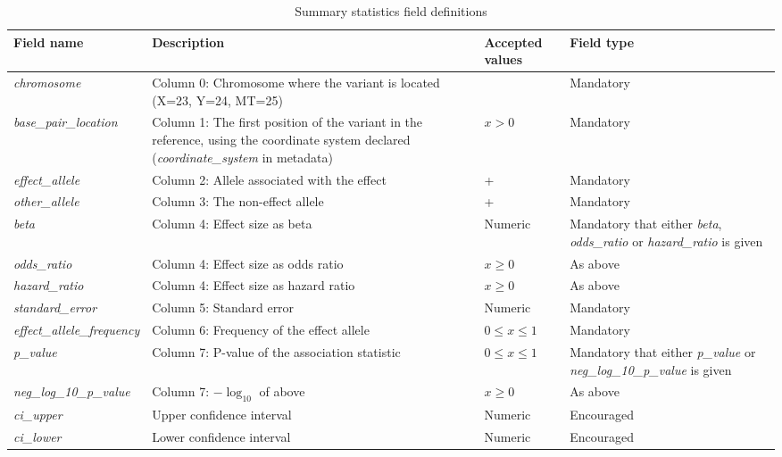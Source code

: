 \documentclass[11pt]{article}
\begin{document}
\begin{landscape}
\begin{table}[h]
 \begin{threeparttable}
  \caption{Summary statistics field definitions}
  \centering
  \small
  \begin{tabularx}{\linewidth} { 
    | >{\hsize=0.7\hsize\centering\arraybackslash}X 
    | >{\hsize=1\hsize\centering\arraybackslash}X 
    | >{\hsize=1.5\hsize\centering\arraybackslash}X 
    | >{\hsize=0.8\hsize\centering\arraybackslash}X | } 
   \hline
   Field name & Description & Accepted values & Field type \\
   \hline
   \textit{chromosome} & Column 0: Chromosome where the variant is located (X=23, Y=24, MT=25) & [1-25] & Mandatory\\
   \textit{base\_pair\_location} & Column 1: The first position of the variant in the reference, using the coordinate system declared (\textit{coordinate\_system} in metadata)  & $x > 0$ & Mandatory\\
   \textit{effect\_allele} & Column 2: Allele associated with the effect & [ACGT]+ & Mandatory\\
   \textit{other\_allele} & Column 3: The non-effect allele & [ACGT]+ & Mandatory\\
   \textit{beta} & Column 4: Effect size as beta & Numeric & Mandatory that either \textit{beta}, \textit{odds\_ratio} or \textit{hazard\_ratio} is given\\
   \textit{odds\_ratio} & Column 4: Effect size as odds ratio & $x \ge 0$ & As above\\
   \textit{hazard\_ratio} & Column 4: Effect size as hazard ratio & $x \ge 0$ & As above\\
   \textit{standard\_error} & Column 5: Standard error & Numeric & Mandatory\\
   \textit{effect\_allele\_frequency} & Column 6: Frequency of the effect allele & $0 \le x \le 1$\tnote{b} & Mandatory\\
   \textit{p\_value} & Column 7: P-value of the association statistic & $0 \le x \le 1$ \tnote{a} & Mandatory that either \textit{p\_value} or \textit{neg\_log\_10\_p\_value} is given\\
   \textit{neg\_log\_10\_p\_value} & Column 7: $-\log_{10}$ of above& $x \ge 0$ \tnote{a} & As above \\
   \textit{ci\_upper} & Upper confidence interval & Numeric & Encouraged\\
   \textit{ci\_lower} & Lower confidence interval & Numeric & Encouraged\\

\end{tabularx}
\end{threeparttable}
\end{table}
\end{landscape}
\end{document}
